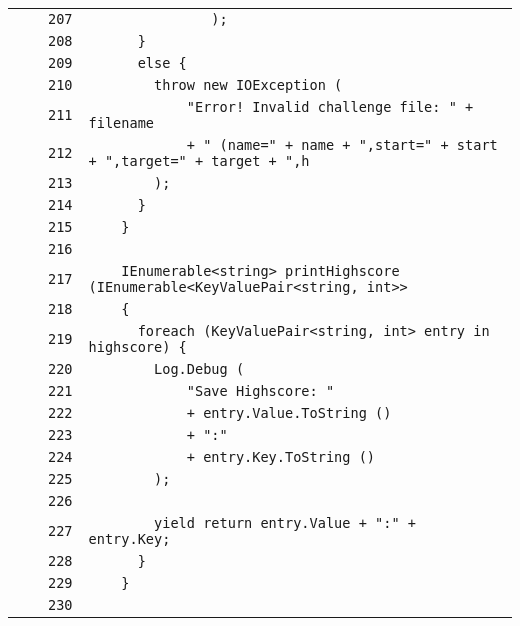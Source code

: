 \documentclass[a4paper,10pt]{article}
\begin{document}
\begin{longtable}[l]{lrrl}
\cellcolor{gray} &  & \verb~207~ & \verb~               );~\\
\cellcolor{gray} &  & \verb~208~ & \verb~      }~\\
\cellcolor{gray} &  & \verb~209~ & \verb~      else {~\\
\cellcolor{gray} &  & \verb~210~ & \verb~        throw new IOException (~\\
\cellcolor{gray} &  & \verb~211~ & \verb~            "Error! Invalid challenge file: " + filename~\\
\cellcolor{gray} &  & \verb~212~ & \verb~            + " (name=" + name + ",start=" + start + ",target=" + target + ",h~\\
\cellcolor{gray} &  & \verb~213~ & \verb~        );~\\
\cellcolor{gray} &  & \verb~214~ & \verb~      }~\\
\cellcolor{gray} &  & \verb~215~ & \verb~    }~\\
\cellcolor{gray} &  & \verb~216~ & \verb~~\\
\cellcolor{gray} &  & \verb~217~ & \verb~    IEnumerable<string> printHighscore (IEnumerable<KeyValuePair<string, int>>~\\
\cellcolor{gray} &  & \verb~218~ & \verb~    {~\\
\cellcolor{gray} &  & \verb~219~ & \verb~      foreach (KeyValuePair<string, int> entry in highscore) {~\\
\cellcolor{gray} &  & \verb~220~ & \verb~        Log.Debug (~\\
\cellcolor{gray} &  & \verb~221~ & \verb~            "Save Highscore: "~\\
\cellcolor{gray} &  & \verb~222~ & \verb~            + entry.Value.ToString ()~\\
\cellcolor{gray} &  & \verb~223~ & \verb~            + ":"~\\
\cellcolor{gray} &  & \verb~224~ & \verb~            + entry.Key.ToString ()~\\
\cellcolor{gray} &  & \verb~225~ & \verb~        );~\\
\cellcolor{gray} &  & \verb~226~ & \verb~~\\
\cellcolor{gray} &  & \verb~227~ & \verb~        yield return entry.Value + ":" + entry.Key;~\\
\cellcolor{gray} &  & \verb~228~ & \verb~      }~\\
\cellcolor{gray} &  & \verb~229~ & \verb~    }~\\
\cellcolor{gray} &  & \verb~230~ & \verb~~\\

\end{longtable}
\end{document}

